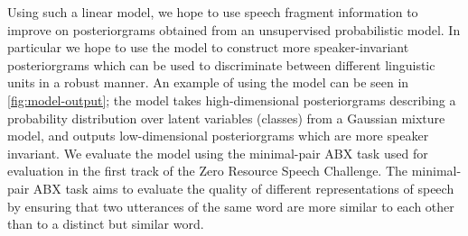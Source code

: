 Using such a linear model, we hope to use speech fragment information to improve on posteriorgrams obtained from an unsupervised probabilistic model.
In particular we hope to use the model to construct more speaker-invariant posteriorgrams which can be used to discriminate between different linguistic units in a robust manner.
An example of using the model can be seen in \cref{fig:model-output}; the model takes high-dimensional posteriorgrams describing a probability distribution over latent variables (classes) from a Gaussian mixture model, and outputs low-dimensional posteriorgrams which are more speaker invariant.
We evaluate the model using the minimal-pair ABX task used for evaluation in the first track of the Zero Resource Speech Challenge.
The minimal-pair ABX task aims to evaluate the quality of different representations of speech by ensuring that two utterances of the same word are more similar to each other than to a distinct but similar word.

